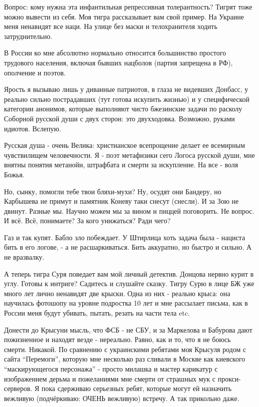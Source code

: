 Вопрос: кому нужна эта инфантильная репрессивная толерантность? Тигрят тоже
можно вывести из себя. Моя тигра рассказывает вам свой пример. На Украине меня
ненавидят все наци. На улице без маски и телохранителя ходить затруднительно.

В России ко мне абсолютно нормально относится большинство простого трудового
населения, включая бывших нацболов (партия запрещена в РФ), ополчение и поэтов.

Ярость я вызываю лишь у диванные патриотов, в глаза не видевших Донбасс, у
реально сильно пострадавших (тут готова искупить жизнью) и у специфической
категории анонимов, которые выполняют чисто бжезинские задачи по расколу
Соборной русской души с двух сторон: это двухходовка. Возможно, руками идиотов.
Вслепую.

Русская душа - очень Велика: христианское всепрощение делает ее всемирным
чувствилищем человечности. Я - поэт метафизики сего Логоса русской души, мне
внятны понятия метанойи, штрафбата и смерти за искупление. На все - воля Божья.

Но, сынку, помогли тебе твои бляхи-мухи? Ну, осудят они Бандеру, но Карбышева
не примут и памятник Коневу таки снесут (снесли). И за Зою не двинут. Разные
мы. Научно можем мы за вином и пиццей поговорить. Не вопрос. И всё. Всё,
понимаете? За кого унижаться? Ради чего? 

Газ и так купят. Бабло зло побеждает.  У Штирлица хоть задача была - нациста
бить в его логове, - а не расшаркиваться. Бить аккуратно, но быстро и сильно. А
не вразвалку. 

А теперь тигра Суря поведает вам мой личный детектив. Донцова нервно курит в
углу. Готовы к интриге? Садитесь и слушайте сказку. Тигру Сурю в лице БЖ уже
много лет лично ненавидят две крыски. Одна из них - реально крыса: она
научилась фотошопу на уровне подростка 10 лет и мне рассылает письма, как в
России меня будут убивать, пытать, резать на части тела etc. 

Донести до Крысуни мысль, что ФСБ - не СБУ, и за Маркелова и Бабурова дают
пожизненное и находят везде - нереально. Равно, как и то, что я не боюсь
смерти. Никакой. По сравнению с украинскими ребятами моя Крысуля родом с сайта
\enquote{Перемоги}, которую мне несколько раз сливали в Москве как киевского
\enquote{маскирующегося персонажа} - просто милашка и мастер карикатур с изображением
дерьма и пожеланиями мне смерти от страшных мук с прокси-серверов. Я пока
сдерживаю серьезных ребят, которые могут ей назначить вежливую (подчёркиваю:
ОЧЕНЬ вежливую) встречу. А так прикольно даже. 

